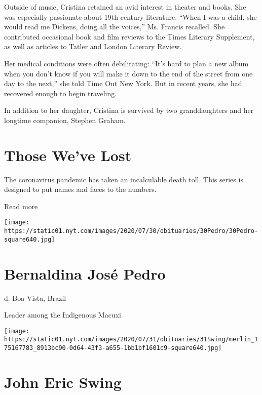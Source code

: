 Outside of music, Cristina retained an avid interest in theater and
books. She was especially passionate about 19th-century literature.
``When I was a child, she would read me Dickens, doing all the voices,''
Ms. Francis recalled. She contributed occasional book and film reviews
to the Times Literary Supplement, as well as articles to Tatler and
London Literary Review.

Her medical conditions were often debilitating: ``It's hard to plan a
new album when you don't know if you will make it down to the end of the
street from one day to the next,'' she told Time Out New York. But in
recent years, she had recovered enough to begin traveling.

In addition to her daughter, Cristina is survived by two granddaughters
and her longtime companion, Stephen Graham.

\href{https://www.nytimes.com/interactive/2020/obituaries/people-died-coronavirus-obituaries.html?action=click\&pgtype=Article\&state=default\&region=BELOW_MAIN_CONTENT\&context=covid_obits_promo}{}

\hypertarget{those-weve-lost}{%
\section{Those We've Lost}\label{those-weve-lost}}

The coronavirus pandemic has taken an incalculable death toll. This
series is designed to put names and faces to the numbers.

Read more

\texttt{[image: https://static01.nyt.com/images/2020/07/30/obituaries/30Pedro/30Pedro-square640.jpg]}

\hypertarget{bernaldina-josuxe9-pedro}{%
\section{Bernaldina José Pedro}\label{bernaldina-josuxe9-pedro}}

d. Boa Vista, Brazil

Leader among the Indigenous Macuxi

\texttt{[image: https://static01.nyt.com/images/2020/07/31/obituaries/31Swing/merlin\_175167783\_8913bc90-0d64-43f3-a655-1bb1bf1601c9-square640.jpg]}

\hypertarget{john-eric-swing}{%
\section{John Eric Swing}\label{john-eric-swing}}

